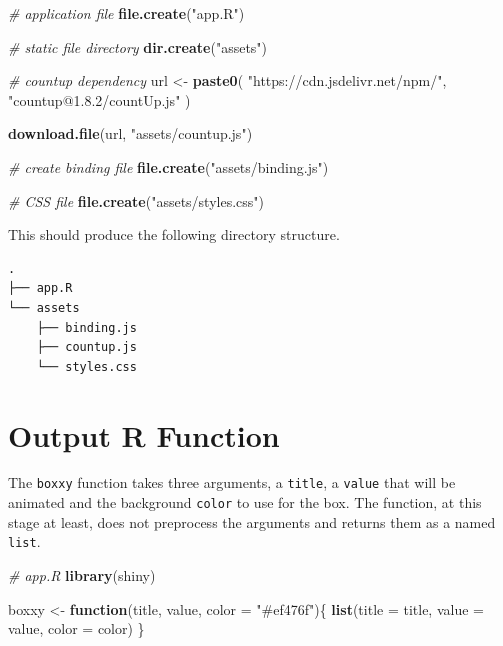 \documentclass[
  10pt,
]{krantz}
\makeatletter
\newenvironment{Shaded}{\begin{snugshade}}{\end{snugshade}}
\newcommand{\CommentTok}[1]{\textcolor[rgb]{0.37,0.37,0.37}{\textit{#1}}}
\newcommand{\ControlFlowTok}[1]{\textcolor[rgb]{0.27,0.27,0.27}{\textbf{#1}}}
\newcommand{\DataTypeTok}[1]{\textcolor[rgb]{0.27,0.27,0.27}{#1}}
\newcommand{\KeywordTok}[1]{\textcolor[rgb]{0.27,0.27,0.27}{\textbf{#1}}}
\newcommand{\NormalTok}[1]{#1}
\newcommand{\StringTok}[1]{\textcolor[rgb]{0.5,0.5,0.5}{#1}}
\newenvironment{kframe}{%
\medskip{}
\setlength{\fboxsep}{.8em}
 \def\at@end@of@kframe{}%
 \ifinner\ifhmode%
  \def\at@end@of@kframe{\end{minipage}}%
  \begin{minipage}{\columnwidth}%
 \fi\fi%
 \def\FrameCommand##1{\hskip\@totalleftmargin \hskip-\fboxsep
 \colorbox{shadecolor}{##1}\hskip-\fboxsep
     \hskip-\linewidth \hskip-\@totalleftmargin \hskip\columnwidth}%
 \MakeFramed {\advance\hsize-\width
   \@totalleftmargin\z@ \linewidth\hsize
   \@setminipage}}%
 {\par\unskip\endMakeFramed%
 \at@end@of@kframe}
\renewenvironment{Shaded}{\begin{kframe}}{\end{kframe}}
\makeatother
\begin{document}
\begin{Shaded}
\begin{Highlighting}[]
\CommentTok{\# application file}
\KeywordTok{file.create}\NormalTok{(}\StringTok{"app.R"}\NormalTok{)}

\CommentTok{\# static file directory}
\KeywordTok{dir.create}\NormalTok{(}\StringTok{"assets"}\NormalTok{)}

\CommentTok{\# countup dependency}
\NormalTok{url <{-}}\StringTok{ }\KeywordTok{paste0}\NormalTok{(}
  \StringTok{"https://cdn.jsdelivr.net/npm/"}\NormalTok{,}
  \StringTok{"countup@1.8.2/countUp.js"}
\NormalTok{)}

\KeywordTok{download.file}\NormalTok{(url, }\StringTok{"assets/countup.js"}\NormalTok{)}

\CommentTok{\# create binding file}
\KeywordTok{file.create}\NormalTok{(}\StringTok{"assets/binding.js"}\NormalTok{)}

\CommentTok{\# CSS file}
\KeywordTok{file.create}\NormalTok{(}\StringTok{"assets/styles.css"}\NormalTok{)}
\end{Highlighting}
\end{Shaded}

This should produce the following directory structure.

\begin{verbatim}
.
├── app.R
└── assets
    ├── binding.js
    ├── countup.js
    └── styles.css
\end{verbatim}

\hypertarget{shiny-output-r-fun}{%
\section{Output R Function}\label{shiny-output-r-fun}}

The \texttt{boxxy} function takes three arguments, a \texttt{title}, a \texttt{value} that will be animated and the background \texttt{color} to use for the box. The function, at this stage at least, does not preprocess the arguments and returns them as a named \texttt{list}.

\begin{Shaded}
\begin{Highlighting}[]
\CommentTok{\# app.R}
\KeywordTok{library}\NormalTok{(shiny)}

\NormalTok{boxxy <{-}}\StringTok{ }\ControlFlowTok{function}\NormalTok{(title, value, }\DataTypeTok{color =} \StringTok{"\#ef476f"}\NormalTok{)\{}
  \KeywordTok{list}\NormalTok{(}\DataTypeTok{title =}\NormalTok{ title, }\DataTypeTok{value =}\NormalTok{ value, }\DataTypeTok{color =}\NormalTok{ color)}
\NormalTok{\}}
\end{Highlighting}
\end{Shaded}
\end{document}
